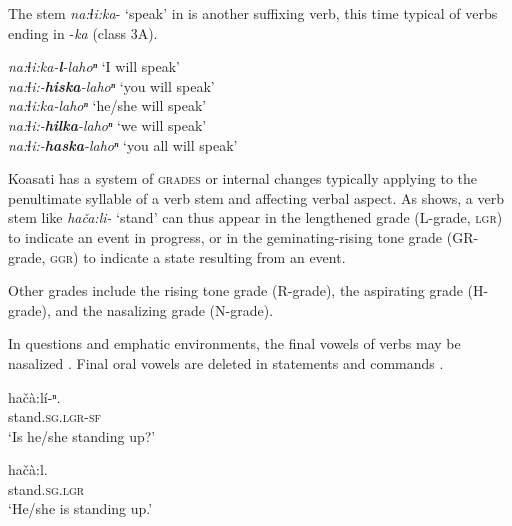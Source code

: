 \documentclass[output=paper,colorlinks,citecolor=brown]{langscibook}
\begin{document}
The stem \textit{na:ɬi:ka}- ‘speak’ in  is another suffixing verb, this time typical of verbs ending in -\textit{ka} (class 3A).

\ea\label{ex:koa:7}
    \textit{na:ɬi:ka-\textbf{l}-lahoⁿ} \tab ‘I will speak’ \\
    \textit{na:ɬi:-\textbf{hiska}-lahoⁿ} \tab ‘you will speak’ \\
    \textit{na:ɬi:ka-lahoⁿ} \tab ‘he/she will speak’ \\
    \textit{na:ɬi:-\textbf{hilka}-lahoⁿ} \tab ‘we will speak’ \\
    \textit{na:ɬi:-\textbf{haska}-lahoⁿ} \tab ‘you all will speak’ \\
\z 

Koasati has a system of \textsc{grades} or internal changes typically applying to the penultimate syllable of a verb stem and affecting verbal aspect. As  shows, a verb stem like \textit{hača:li-} ‘stand’ can thus appear in the lengthened grade (L-grade, \textsc{lgr}) to indicate an event in progress, or in the geminating-rising tone grade (GR-grade, \textsc{ggr}) to indicate a state resulting from an event. 

Other grades include the rising tone grade (R-grade), the aspirating grade (H-grade), and the nasalizing grade (N-grade).

In questions and emphatic environments, the final vowels of verbs may be nasalized . Final oral vowels are deleted in statements and commands .

\ea\label{ex:koa:9}
    \ea\label{ex:koa:9a}
        \gll hačà:lí-ⁿ.\\ 
             stand.\textsc{sg}.\textsc{lgr}-\textsc{sf} \\
        \glt ‘Is he/she standing up?’
    
    \ex\label{ex:koa:9b}
        \gll hačà:l. \\
             stand.\textsc{sg}.\textsc{lgr}\\
        \glt ‘He/she is standing up.’
    \z
\z 
\end{document}
